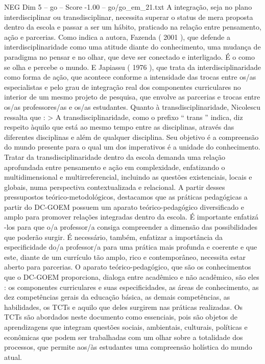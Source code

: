 \begin{textsample}{NEG Dim 5 – go – Score -1.00 – go/go\_em\_21.txt}
A integração, seja no plano interdisciplinar ou transdisciplinar, necessita superar o status de mera proposta dentro da escola e passar a ser um hábito, praticado na relação entre pensamento, ação e parcerias.
Como indica a autora, Fazenda ( 2001 ), que defende a interdisciplinaridade como uma atitude diante do conhecimento, uma mudança de paradigma no pensar e no olhar, que deve ser conectado e interligado.
É o como se olha e percebe o mundo.
E Japiassu ( 1976 ), que trata da interdisciplinaridade como forma de ação, que acontece conforme a intensidade das trocas entre os/as especialistas e pelo grau de integração real dos componentes curriculares no interior de um mesmo projeto de pesquisa, que envolve as parcerias e trocas entre os/as professores/as e os/as estudantes.
Quanto à transdisciplinaridade, Nicolescu ressalta que : > A transdisciplinaridade, como o prefixo “ trans ” indica, diz respeito àquilo que está ao mesmo tempo entre as disciplinas, através das diferentes disciplinas e além de qualquer disciplina.
Seu objetivo é a compreensão do mundo presente para o qual um dos imperativos é a unidade do conhecimento.
Tratar da transdisciplinaridade dentro da escola demanda uma relação aprofundada entre pensamento e ação em complexidade, enfatizando o multidimensional e multirreferencial, incluindo as questões existenciais, locais e globais, numa perspectiva contextualizada e relacional.
A partir desses pressupostos teórico-metodológicos, destacamos que as práticas pedagógicas a partir do DC-GOEM possuem um aparato teórico-pedagógico diversificado e amplo para promover relações integradas dentro da escola.
É importante enfatizá -los para que o/a professor/a consiga compreender a dimensão das possibilidades que poderão surgir.
É necessário, também, enfatizar a importância da especificidade do/a professor/a para uma prática mais profunda e coerente e que este, diante de um currículo tão amplo, rico e contemporâneo, necessita estar aberto para parcerias.
O aparato teórico-pedagógico, que são os conhecimentos que o DC-GOEM proporciona, dialoga entre acadêmico e não acadêmico, são eles : os componentes curriculares e suas especificidades, as áreas de conhecimento, as dez competências gerais da educação básica, as demais competências, as habilidades, os TCTs e aquilo que deles surgirem nas práticas realizadas.
Os TCTs são abordados neste documento como essenciais, pois são objetos de aprendizagens que integram questões sociais, ambientais, culturais, políticas e econômicas que podem ser trabalhadas com um olhar sobre a totalidade dos processos, que permite aos/às estudantes uma compreensão holística do mundo atual.

\end{textsample}
